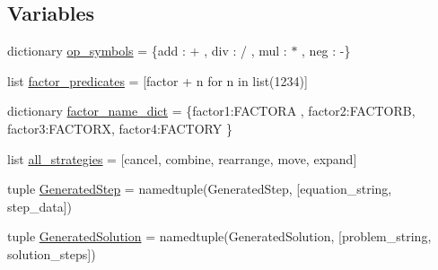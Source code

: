 \subsection*{Variables}
\begin{DoxyCompactItemize}
\item 
dictionary \hyperlink{namespacetotally__new__visualizer_a3dd0f4daa013b2acf2fbd1f7aa0ad07c}{op\+\_\+symbols} = \{\textquotesingle{}add\textquotesingle{} \+: \textquotesingle{}+\textquotesingle{} , \textquotesingle{}div\textquotesingle{} \+: \textquotesingle{}/\textquotesingle{} , \textquotesingle{}mul\textquotesingle{} \+: \textquotesingle{}$\ast$\textquotesingle{} , \textquotesingle{}neg\textquotesingle{} \+: \textquotesingle{}-\/\textquotesingle{}\}
\item 
list \hyperlink{namespacetotally__new__visualizer_ab706e5502043e33aaccc4cd5db3a11a8}{factor\+\_\+predicates} = \mbox{[}\textquotesingle{}factor\textquotesingle{} + n for n in list(\textquotesingle{}1234\textquotesingle{})\mbox{]}
\item 
dictionary \hyperlink{namespacetotally__new__visualizer_ac35b4d88f3973e9437d26d620f6404d3}{factor\+\_\+name\+\_\+dict} = \{\textquotesingle{}factor1\textquotesingle{}\+:\textquotesingle{}F\+A\+C\+T\+O\+R\+A\textquotesingle{} , \textquotesingle{}factor2\textquotesingle{}\+:\textquotesingle{}F\+A\+C\+T\+O\+R\+B\textquotesingle{}, \textquotesingle{}factor3\textquotesingle{}\+:\textquotesingle{}F\+A\+C\+T\+O\+R\+X\textquotesingle{}, \textquotesingle{}factor4\textquotesingle{}\+:\textquotesingle{}F\+A\+C\+T\+O\+R\+Y\textquotesingle{} \}
\item 
list \hyperlink{namespacetotally__new__visualizer_a0336db197e4d6b0cc49dd792fa21d890}{all\+\_\+strategies} = \mbox{[}\textquotesingle{}cancel\textquotesingle{}, \textquotesingle{}combine\textquotesingle{}, \textquotesingle{}rearrange\textquotesingle{}, \textquotesingle{}move\textquotesingle{}, \textquotesingle{}expand\textquotesingle{}\mbox{]}
\item 
tuple \hyperlink{namespacetotally__new__visualizer_a69a6b4328317f3ea8abc150eafbda370}{Generated\+Step} = namedtuple(\textquotesingle{}Generated\+Step\textquotesingle{}, \mbox{[}\textquotesingle{}equation\+\_\+string\textquotesingle{}, \textquotesingle{}step\+\_\+data\textquotesingle{}\mbox{]})
\item 
tuple \hyperlink{namespacetotally__new__visualizer_ab9dc95295259f8165e1fdf15f954d2b1}{Generated\+Solution} = namedtuple(\textquotesingle{}Generated\+Solution\textquotesingle{}, \mbox{[}\textquotesingle{}problem\+\_\+string\textquotesingle{}, \textquotesingle{}solution\+\_\+steps\textquotesingle{}\mbox{]})
\end{DoxyCompactItemize}


